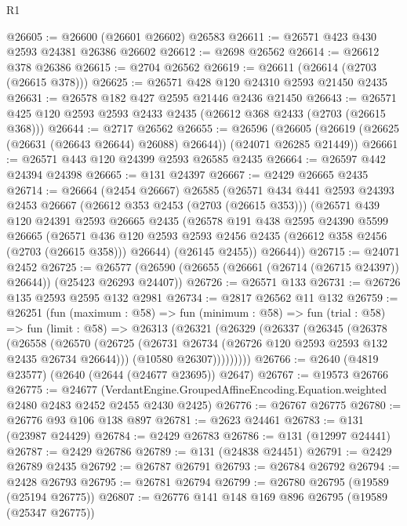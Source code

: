 \begin{lexlean}{R1}
\begin{coremodule}
@26605 := @26600 (@26601 @26602) @26583
@26611 := @26571 @423 @430 @2593 @24381 @26386 @26602
@26612 := @2698 @26562
@26614 := @26612 @378 @26386
@26615 := @2704 @26562
@26619 := @26611 (@26614 (@2703 (@26615 @378)))
@26625 := @26571 @428 @120 @24310 @2593 @21450 @2435
@26631 := @26578 @182 @427 @2595 @21446 @2436 @21450
@26643 := @26571 @425 @120 @2593 @2593 @2433 @2435 (@26612 @368 @2433 (@2703 (@26615 @368)))
@26644 := @2717 @26562
@26655 := @26596
    (@26605 (@26619 (@26625 (@26631 (@26643 @26644) @26088) @26644)) (@24071 @26285 @21449))
@26661 := @26571 @443 @120 @24399 @2593 @26585 @2435
@26664 := @26597 @442 @24394 @24398
@26665 := @131 @24397
@26667 := @2429 @26665 @2435
@26714 := @26664
    (@2454 @26667)
    @26585
    (@26571
      @434
      @441
      @2593
      @24393
      @2453
      @26667
      (@26612 @353 @2453 (@2703 (@26615 @353)))
      (@26571
        @439
        @120
        @24391
        @2593
        @26665
        @2435
        (@26578
          @191
          @438
          @2595
          @24390
          @5599
          @26665
          (@26571
            @436
            @120
            @2593
            @2593
            @2456
            @2435
            (@26612 @358 @2456 (@2703 (@26615 @358)))
            @26644)
          (@26145 @2455))
        @26644))
@26715 := @24071 @2452
@26725 := @26577 (@26590 (@26655 (@26661 (@26714 (@26715 @24397)) @26644)) (@25423 @26293 @24407))
@26726 := @26571 @133
@26731 := @26726 @135 @2593 @2595 @132 @2981
@26734 := @2817 @26562 @11 @132
@26759 := @26251
    (fun (maximum : @58) =>
    fun (minimum : @58) =>
    fun (trial : @58) =>
    fun (limit : @58) =>
    @26313
      (@26321
        (@26329
          (@26337
            (@26345
              (@26378
                (@26558
                  (@26570
                    (@26725 (@26731 @26734 (@26726 @120 @2593 @2593 @132 @2435 @26734 @26644)))
                    (@10580 @26307)))))))))
@26766 := @2640 (@4819 @23577) (@2640 (@2644 (@24677 @23695)) @2647)
@26767 := @19573 @26766
@26775 := @24677
    (VerdantEngine.GroupedAffineEncoding.Equation.weighted @2480 @2483 @2452 @2455 @2430 @2425)
@26776 := @26767 @26775
@26780 := @26776 @93 @106 @138 @897
@26781 := @2623 @24461
@26783 := @131 (@23987 @24429)
@26784 := @2429 @26783
@26786 := @131 (@12997 @24441)
@26787 := @2429 @26786
@26789 := @131 (@24838 @24451)
@26791 := @2429 @26789 @2435
@26792 := @26787 @26791
@26793 := @26784 @26792
@26794 := @2428 @26793
@26795 := @26781 @26794
@26799 := @26780 @26795 (@19589 (@25194 @26775))
@26807 := @26776 @141 @148 @169 @896 @26795 (@19589 (@25347 @26775))

\end{coremodule}
\end{lexlean}
